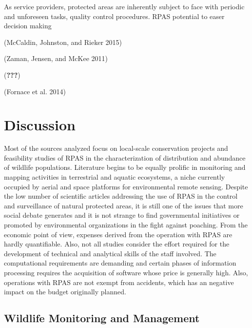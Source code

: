 \documentclass[]{interact}
\theoremstyle{plain}%
\theoremstyle{definition}
\theoremstyle{remark}
\begin{document}
As service providers, protected areas are inherently subject to face
with periodic and unforeseen tasks, quality control procedures. RPAS
potential to easer decision making

(McCaldin, Johnston, and Rieker 2015)

(Zaman, Jensen, and McKee 2011)

({\textbf{???}})

(Fornace et al. 2014)

\section{Discussion}\label{discussion}

Most of the sources analyzed focus on local-scale conservation projects
and feasibility studies of RPAS in the characterization of distribution
and abundance of wildlife populations. Literature begins to be equally
prolific in monitoring and mapping activities in terrestrial and aquatic
ecosystems, a niche currently occupied by aerial and space platforms for
environmental remote sensing. Despite the low number of scientific
articles addressing the use of RPAS in the control and surveillance of
natural protected areas, it is still one of the issues that more social
debate generates and it is not strange to find governmental initiatives
or promoted by environmental organizations in the fight against
poaching. From the economic point of view, expenses derived from the
operation with RPAS are hardly quantifiable. Also, not all studies
consider the effort required for the development of technical and
analytical skills of the staff involved. The computational requirements
are demanding and certain phases of information processing requires the
acquisition of software whose price is generally high. Also, operations
with RPAS are not exempt from accidents, which has an negative impact on
the budget originally planned.

\subsection{Wildlife Monitoring and
Management}\label{wildlife-monitoring-and-management-1}
\end{document}
